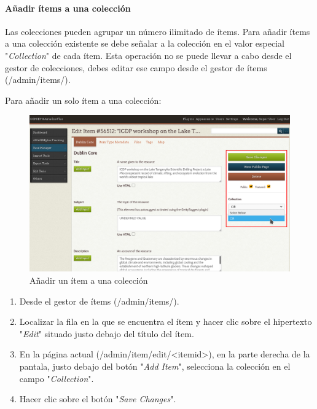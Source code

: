 \documentclass[
]{article}
\providecommand{\tightlist}{%
  \setlength{\itemsep}{0pt}\setlength{\parskip}{0pt}}
\begin{document}
\hypertarget{auxf1adir-uxedtems-a-una-colecciuxf3n}{%
\paragraph{Añadir ítems a una
colección}\label{auxf1adir-uxedtems-a-una-colecciuxf3n}}

Las colecciones pueden agrupar un número ilimitado de ítems. Para añadir
ítems a una colección existente se debe señalar a la colección en el
valor especial "\emph{Collection}" de cada ítem. Esta operación no se
puede llevar a cabo desde el gestor de colecciones, debes editar ese
campo desde el gestor de ítems ({/admin/items/}).

Para añadir un solo ítem a una colección:

\begin{figure}
\hypertarget{add-item-collection}{%
\centering
\includegraphics{../_static/images/add-item-collection.png}
\caption{Añadir un ítem a una colección}\label{add-item-collection}
}
\end{figure}

\begin{enumerate}
\def\labelenumi{\arabic{enumi}.}
\tightlist
\item
  Desde el gestor de ítems ({/admin/items/}).
\item
  Localizar la fila en la que se encuentra el ítem y hacer clic sobre el
  hipertexto "\emph{Edit}" situado justo debajo del título del ítem.
\item
  En la página actual
  ({/admin/item/edit/\textless itemid\textgreater{}}), en la parte
  derecha de la pantala, justo debajo del botón "\emph{Add Item}",
  selecciona la colección en el campo "\emph{Collection}".
\item
  Hacer clic sobre el botón "\emph{Save Changes}".
\end{enumerate}
\end{document}
